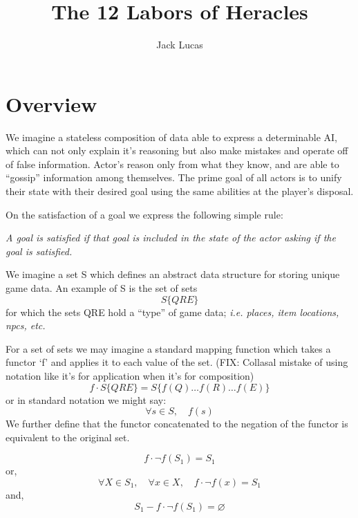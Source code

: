 \documentclass[11pt,twocolumn]{article}
\title{The 12 Labors of Heracles}
\author{Jack Lucas}
\begin{document}
\maketitle
\section{Overview}
We imagine a stateless composition of data able to express a determinable AI, which can not only explain it's reasoning but also make mistakes and operate off of false information.  Actor's reason only from what they know,  and are able to ``gossip'' information among themselves. The prime goal of all actors is to unify their state with their desired goal using the same abilities at the player's disposal.

On the satisfaction of a goal we express the following simple rule:\begin{displayquote}
\textit{A goal is satisfied if that goal is included in the state of the actor asking if the goal is satisfied.}\end{displayquote}

We imagine a set S which defines an abstract data structure for storing unique game data. An example of S is the set of sets \begin{displaymath}S \{ Q R E \}\end{displaymath} for which the sets QRE hold a ``type'' of game data;  \textit{i.e. places, item locations, npcs, etc.}

For a set of sets we may imagine a standard mapping function which takes a functor `f' and applies it to each value of the set. (FIX:  Collasal mistake of using notation like it's for application when it's for composition)
\begin{displaymath}f \cdot S\{ QRE\} = S\{ f(Q)\dots f(R)\dots f(E) \}\end{displaymath}
or in standard notation we might say:
\begin{displaymath}\forall s \in S, \quad f(s)\end{displaymath}
We further define that the functor concatenated to the negation of the functor is equivalent to the original set.

\begin{displaymath}f \cdot \neg f ( S_1) = S_1\end{displaymath}
or,
\begin{displaymath}\forall X \in S_1,\quad\forall x \in X,\quad  f \cdot \neg f (x) = S_1
  \end{displaymath}
  and,
  \begin{displaymath}S_1 - f \cdot \neg f (S_1) = \varnothing \end{displaymath}
\end{document}
